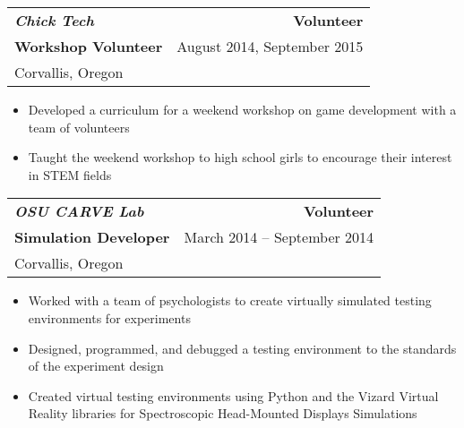 \documentclass[letterpaper,10pt,titlepage]{article}
\begin{document}
\begin{tabularx}{\linewidth}{Xr}
\textbf{\textit{Chick Tech}}   & \textbf{Volunteer}\\
\textbf{Workshop Volunteer}    & August 2014, September 2015\\
Corvallis, Oregon & \\
\end{tabularx}

\begin{itemize} \itemsep1pt \parskip0pt 
\item Developed a curriculum for a weekend workshop on game development with a team of volunteers
\item Taught the weekend workshop to high school girls to encourage their interest in STEM fields
\end{itemize}

\begin{tabularx}{\linewidth}{Xr}
\textbf{\textit{OSU CARVE Lab}} & \textbf{Volunteer}\\
\textbf{Simulation Developer}   & March 2014 -- September 2014\\
Corvallis, Oregon & \\
\end{tabularx}
\begin{itemize} \itemsep1pt \parskip0pt 
\item Worked with a team of psychologists to create virtually simulated testing environments for experiments
\item Designed, programmed, and debugged a testing environment to the standards of the experiment design
\item Created virtual testing environments using Python and the Vizard Virtual Reality libraries for Spectroscopic Head-Mounted Displays Simulations
\end{itemize}


\begin{comment} %
\begin{tabularx}{\linewidth}{Xr}
\textbf{\textit{Crossroads Carnegie Art Center}} & \textbf{Volunteer}\\
\textbf{Technical Support, Web Master}           & June 2013 -- August 2013\\
Baker City, Oregon & \\
\end{tabularx}

\begin{itemize} \itemsep1pt \parskip0pt \parsep0pt
\item Created digital backups of previous years tax information
\item Transferred customer data to a new cloud database for the Center
\item Maintained custom PHP/XHTML website to specifications
\item Provided consultation on creation of requirements for a new website
\end{itemize}
\end{comment}
\end{document}
